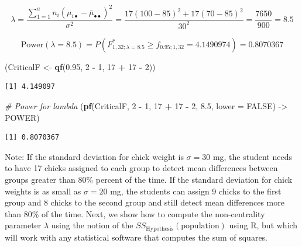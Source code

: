 \documentclass[
]{article}
\newenvironment{Shaded}{\begin{snugshade}}{\end{snugshade}}
\newcommand{\AttributeTok}[1]{\textcolor[rgb]{0.13,0.29,0.53}{#1}}
\newcommand{\CommentTok}[1]{\textcolor[rgb]{0.56,0.35,0.01}{\textit{#1}}}
\newcommand{\ConstantTok}[1]{\textcolor[rgb]{0.56,0.35,0.01}{#1}}
\newcommand{\DecValTok}[1]{\textcolor[rgb]{0.00,0.00,0.81}{#1}}
\newcommand{\FloatTok}[1]{\textcolor[rgb]{0.00,0.00,0.81}{#1}}
\newcommand{\FunctionTok}[1]{\textcolor[rgb]{0.13,0.29,0.53}{\textbf{#1}}}
\newcommand{\NormalTok}[1]{#1}
\newcommand{\OtherTok}[1]{\textcolor[rgb]{0.56,0.35,0.01}{#1}}
\newcommand{\SpecialCharTok}[1]{\textcolor[rgb]{0.81,0.36,0.00}{\textbf{#1}}}
\begin{document}
\begin{equation*}
\lambda = \frac{\sum_{1 = 1}^an_i(\mu_{i\bullet} - \bar{\mu}_{\bullet\bullet})^2}{\sigma^2} = \frac{17(100 - 85)^2 + 17(70 - 85)^2}{30^2} = \frac{7650}{900} = 8.5
\end{equation*}

\[\text{Power}(\lambda = 8.5) = P(F^*_{1, 32; \lambda = 8.5} \geq f_{0.95; 1, 32} = 4.1490974) = 0.8070367\]

\begin{Shaded}
\begin{Highlighting}[]
\NormalTok{(CriticalF }\OtherTok{\textless{}{-}} \FunctionTok{qf}\NormalTok{(}\FloatTok{0.95}\NormalTok{, }\DecValTok{2} \SpecialCharTok{{-}} \DecValTok{1}\NormalTok{, }\DecValTok{17} \SpecialCharTok{+} \DecValTok{17} \SpecialCharTok{{-}} \DecValTok{2}\NormalTok{))}
\end{Highlighting}
\end{Shaded}

\begin{verbatim}
[1] 4.149097
\end{verbatim}

\begin{Shaded}
\begin{Highlighting}[]
\CommentTok{\# Power for lambda}
\NormalTok{(}\FunctionTok{pf}\NormalTok{(CriticalF, }\DecValTok{2} \SpecialCharTok{{-}} \DecValTok{1}\NormalTok{, }\DecValTok{17} \SpecialCharTok{+} \DecValTok{17} \SpecialCharTok{{-}} \DecValTok{2}\NormalTok{, }\FloatTok{8.5}\NormalTok{, }\AttributeTok{lower =} \ConstantTok{FALSE}\NormalTok{) }\OtherTok{{-}\textgreater{}}\NormalTok{ POWER)}
\end{Highlighting}
\end{Shaded}

\begin{verbatim}
[1] 0.8070367
\end{verbatim}

Note: If the standard deviation for chick weight is \(\sigma = 30\) mg, the student needs to have 17 chicks assigned to each group to detect mean differences between groups greater than 80\% percent of the time. If the standard deviation for chick weights is as small as \(\sigma = 20\) mg, the students can assign 9 chicks to the first group and 8 chicks to the second group and still detect mean differences more than 80\% of the time. Next, we show how to compute the non-centrality parameter \(\lambda\) using the notion of the \(SS_\text{Hypothesis}(\text{population})\) using R, but which will work with any statistical software that computes the sum of squares.
\end{document}
